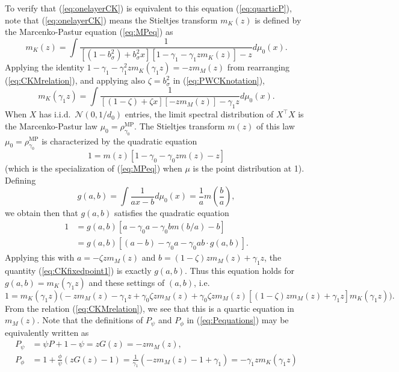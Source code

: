 \documentclass{article}
\theoremstyle{definition}
\newcommand{\N}{\mathcal{N}}
\newcommand{\MP}{\text{MP}}
\newcommand{\1}{\mathbf{1}}
\begin{document}
To verify that (\ref{eq:onelayerCK}) is equivalent to this equation
(\ref{eq:quarticP}), note that (\ref{eq:onelayerCK})
means the Stieltjes transform $m_K(z)$ is defined by the Marcenko-Pastur
equation (\ref{eq:MPeq}) as
\begin{equation}\label{eq:MP}
m_K(z)=\int \frac{1}{[(1-b_\sigma^2)+b_\sigma^2 x][1-\gamma_1-\gamma_1 z
m_K(z)]-z}d\mu_0(x).
\end{equation}
Applying the identity $1-\gamma_1-\gamma_1^2 zm_K(\gamma_1 z)
=-zm_M(z)$ from rearranging (\ref{eq:CKMrelation}), and applying also
$\zeta=b_\sigma^2$ in (\ref{eq:PWCKnotation}),
\begin{equation}\label{eq:CKfixedpoint1}
m_K(\gamma_1 z)=\int \frac{1}{[(1-\zeta)+\zeta x][-zm_M(z)]-\gamma_1 z}
d\mu_0(x).
\end{equation}
When $X$ has i.i.d.\ $\N(0,1/d_0)$ entries, the limit spectral distribution
of $X^\top X$ is the Marcenko-Pastur law $\mu_0=\rho_{\gamma_0}^\MP$.
The Stieltjes transform $m(z)$ of this law $\mu_0=\rho_{\gamma_0}^\MP$ is
characterized by the quadratic equation
\[1=m(z)[1-\gamma_0-\gamma_0zm(z)-z]\]
(which is the specialization of (\ref{eq:MPeq}) when $\mu$ is the point
distribution at 1). Defining
\[g(a,b)=\int \frac{1}{ax-b}d\mu_0(x)=\frac{1}{a}m\left(\frac{b}{a}\right),\]
we obtain then that $g(a,b)$ satisfies the quadratic equation
\begin{align*}
1&=g(a,b)[a-\gamma_0a-\gamma_0bm(b/a)-b]\\
&=g(a,b)[(a-b)-\gamma_0a-\gamma_0ab \cdot g(a,b)].
\end{align*}
Applying this with $a=-\zeta zm_M(z)$ and $b=(1-\zeta)zm_M(z)+\gamma_1 z$,
the quantity (\ref{eq:CKfixedpoint1}) is exactly $g(a,b)$. Thus this equation
holds for $g(a,b)=m_K(\gamma_1z)$ and these settings of $(a,b)$, i.e.\
\begin{equation}\label{eq:CKfixedpoint2}
1=m_K(\gamma_1 z)\Big(-zm_M(z)-\gamma_1 z+\gamma_0\zeta zm_M(z)
+\gamma_0\zeta zm_M(z)[(1-\zeta)zm_M(z)+\gamma_1 z]m_K(\gamma_1 z)\Big).
\end{equation}
From the relation (\ref{eq:CKMrelation}), we see that this is a quartic equation
in $m_M(z)$. Note that the definitions of $P_\psi$ and $P_\phi$ in 
(\ref{eq:Pequations}) may be equivalently written as
\begin{align*}
P_\psi&=\psi P+1-\psi=zG(z)=-zm_M(z),\\
P_\phi&=1+\frac{\phi}{\psi}(zG(z)-1)
=\frac{1}{\gamma_1}(-zm_M(z)-1+\gamma_1)
=-\gamma_1 zm_K(\gamma_1 z)
\end{align*}
\end{document}
